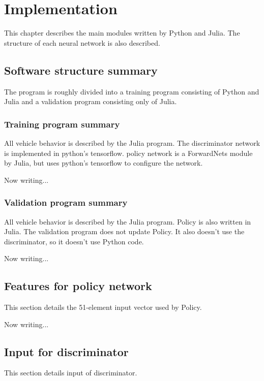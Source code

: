 \chapter{Implementation}
\label{chapter:Implementation}

This chapter describes the main modules written by Python and Julia.
The structure of each neural network is also described.

\section{Software structure summary}

The program is roughly divided into a training program consisting of Python and Julia and a validation program consisting only of Julia.


\subsection{Training program summary}

All vehicle behavior is described by the Julia program. The discriminator network is implemented in python's tensorflow.
policy network is a ForwardNets module by Julia, but uses python's tensorflow to configure the network.

Now writing...


\subsection{Validation program summary}

All vehicle behavior is described by the Julia program. 
Policy is also written in Julia.
The validation program does not update Policy. It also doesn't use the discriminator, so it doesn't use Python code.

Now writing...


\section{Features for policy network}


This section details the 51-element input vector used by Policy.

Now writing...

\section{Input for discriminator}


This section details input of discriminator.

